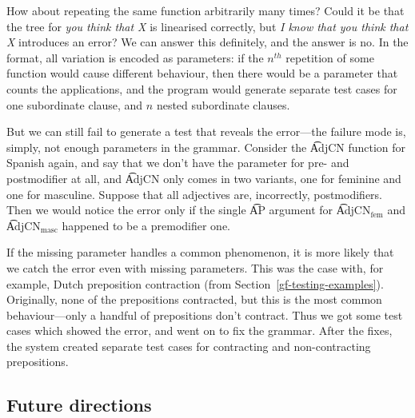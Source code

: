 How about repeating the same function arbitrarily many times? Could it
be that the tree for {\em you think that X} is linearised correctly,
but {\em I know that you think that X} introduces an error? We can
answer this definitely, and the answer is no. In the \pmcfg{} format,
all variation is encoded as parameters: if the $n^{th}$ repetition of
some function would cause different behaviour, then there would be a
parameter that counts the applications, and the program would generate
separate test cases for one subordinate clause, and $n$ nested
subordinate clauses.

But we can still fail to generate a test that reveals the error---the
failure mode is, simply, not enough parameters in the grammar. Consider the
\t{AdjCN} function for Spanish again, and say that we don't have the
parameter for pre- and postmodifier at all, and \t{AdjCN} only comes
in two variants, one for feminine and one for masculine. Suppose that
all adjectives are, incorrectly, postmodifiers. Then we would notice
the error only if the single \t{AP} argument for \t{AdjCN$_{\text{fem}}$}
and \t{AdjCN$_{\text{masc}}$} happened to be a premodifier one.

If the missing parameter handles a common phenomenon, it is more
likely that we catch the error even with missing parameters. This was
the case with, for example, Dutch preposition contraction (from
Section~\ref{gf-testing-examples}). Originally, none of the
prepositions contracted, but this is the most common behaviour---only a
handful of prepositions don't contract. Thus we got some test cases
which showed the error, and went on to fix the grammar. After the
fixes, the system created separate test cases for contracting and
non-contracting prepositions.

\subsection{Future directions}


